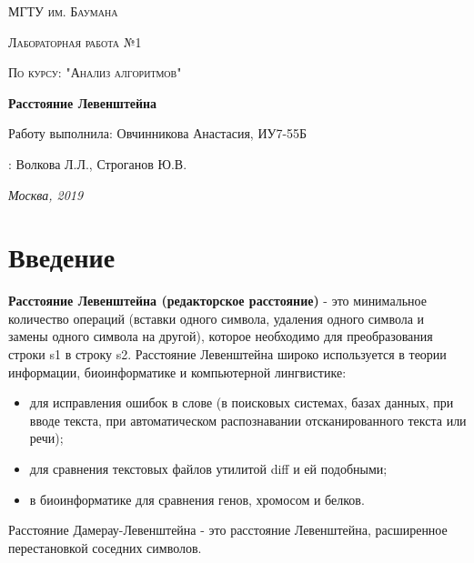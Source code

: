 \documentclass[14pt]{report}
\begin{document}
\begin{titlepage}
	\centering
	{\scshape\LARGE МГТУ им. Баумана \par}
	\vspace{3cm}
	{\scshape\Large Лабораторная работа №1\par}
	\vspace{0.5cm}
	{\scshape\Large По курсу: "Анализ алгоритмов"\par}
	\vspace{1.5cm}
	{\huge\bfseries Расстояние Левенштейна\par}
	\vspace{2cm}
	\Large Работу выполнила: Овчинникова Анастасия, ИУ7-55Б\par
	\vspace{0.5cm}
	:  Волкова Л.Л., Строганов Ю.В.\par

	\vfill
	\large \textit {Москва, 2019} \par
\end{titlepage}

\tableofcontents

\newpage

\chapter*{Введение}

\textbf{Расстояние Левенштейна (редакторское расстояние)} - это минимальное количество операций (вставки одного символа, удаления одного символа и замены одного символа на другой), которое необходимо для преобразования строки s1 в строку s2.
Расстояние Левенштейна широко используется в теории информации, биоинформатике и компьютерной лингвистике:
\begin{itemize}
	\item для исправления ошибок в слове (в поисковых системах, базах данных, при вводе текста, при автоматическом распознавании отсканированного текста или речи);
	\item для сравнения текстовых файлов утилитой diff и ей подобными;
	\item в биоинформатике для сравнения генов, хромосом и белков.
\end{itemize}

Расстояние Дамерау-Левенштейна - это расстояние Левенштейна, расширенное перестановкой соседних символов.
\end{document}
